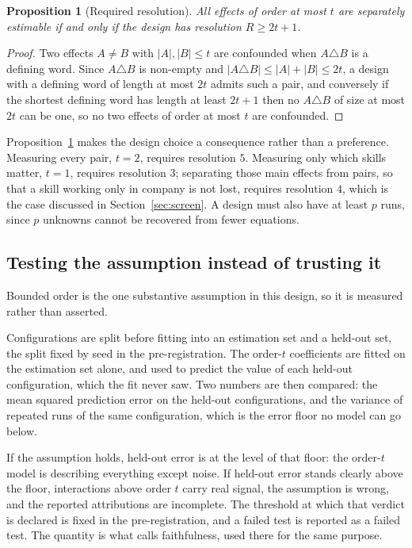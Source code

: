 \documentclass[11pt]{article}
\theoremstyle{plain}
\newtheorem{proposition}[theorem]{Proposition}
\theoremstyle{definition}
\theoremstyle{remark}
\begin{document}
\begin{proposition}[Required resolution]\label{prop:resolution}
All effects of order at most $t$ are separately estimable if and only if the design has resolution $R \ge 2t+1$.
\end{proposition}

\begin{proof}
Two effects $A \neq B$ with $|A|,|B| \le t$ are confounded when $A \triangle B$ is a defining word. Since $A \triangle B$ is non-empty and $|A \triangle B| \le |A| + |B| \le 2t$, a design with a defining word of length at most $2t$ admits such a pair, and conversely if the shortest defining word has length at least $2t+1$ then no $A \triangle B$ of size at most $2t$ can be one, so no two effects of order at most $t$ are confounded.
\end{proof}

Proposition~\ref{prop:resolution} makes the design choice a consequence rather than a preference. Measuring every pair, $t = 2$, requires resolution $5$. Measuring only which skills matter, $t = 1$, requires resolution $3$; separating those main effects from pairs, so that a skill working only in company is not lost, requires resolution $4$, which is the case discussed in Section~\ref{sec:screen}. A design must also have at least $p$ runs, since $p$ unknowns cannot be recovered from fewer equations.

\subsection{Testing the assumption instead of trusting it}
\label{sec:faithful}

Bounded order is the one substantive assumption in this design, so it is measured rather than asserted.

Configurations are split before fitting into an estimation set and a held-out set, the split fixed by seed in the pre-registration. The order-$t$ coefficients are fitted on the estimation set alone, and used to predict the value of each held-out configuration, which the fit never saw. Two numbers are then compared: the mean squared prediction error on the held-out configurations, and the variance of repeated runs of the same configuration, which is the error floor no model can go below.

If the assumption holds, held-out error is at the level of that floor: the order-$t$ model is describing everything except noise. If held-out error stands clearly above the floor, interactions above order $t$ carry real signal, the assumption is wrong, and the reported attributions are incomplete. The threshold at which that verdict is declared is fixed in the pre-registration, and a failed test is reported as a failed test. The quantity is what \cite{spex} calls faithfulness, used there for the same purpose.
\end{document}
